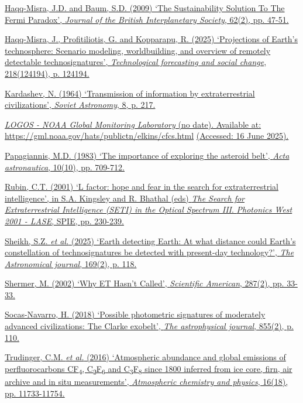 \href{http://paperpile.com/b/hQuIW4/lphP}{Haqq-Misra, J.D. and Baum, S.D. (2009) `The Sustainability Solution To The Fermi Paradox', \emph{Journal of the British Interplanetary Society}, 62(2), pp. 47-51.}

\href{http://paperpile.com/b/hQuIW4/AWHk}{Haqq-Misra, J., Profitiliotis, G. and Kopparapu, R. (2025) `Projections of Earth's technosphere: Scenario modeling, worldbuilding, and overview of remotely detectable technosignatures', \emph{Technological forecasting and social change}, 218(124194), p. 124194.}

\href{http://paperpile.com/b/hQuIW4/6tyN}{Kardashev, N. (1964) `Transmission of information by extraterrestrial civilizations', \emph{Soviet Astronomy}, 8, p. 217.}

\href{http://paperpile.com/b/hQuIW4/zmLw}{\emph{LOGOS - NOAA Global Monitoring Laboratory} (no date). Available at:} \url{https://gml.noaa.gov/hats/publictn/elkins/cfcs.html} \href{http://paperpile.com/b/hQuIW4/zmLw}{(Accessed: 16 June 2025).}

\href{http://paperpile.com/b/hQuIW4/Cy4U}{Papagiannis, M.D. (1983) `The importance of exploring the asteroid belt', \emph{Acta astronautica}, 10(10), pp. 709-712.}

\href{http://paperpile.com/b/hQuIW4/jkfy}{Rubin, C.T. (2001) `L factor: hope and fear in the search for extraterrestrial intelligence', in S.A. Kingsley and R. Bhathal (eds) \emph{The Search for Extraterrestrial Intelligence (SETI) in the Optical Spectrum III}. \emph{Photonics West 2001 - LASE}, SPIE, pp. 230-239.}

\href{http://paperpile.com/b/hQuIW4/rbOz}{Sheikh, S.Z. \emph{et al.} (2025) `Earth detecting Earth: At what distance could Earth's constellation of technosignatures be detected with present-day technology?', \emph{The Astronomical journal}, 169(2), p. 118.}

\href{http://paperpile.com/b/hQuIW4/pYHX}{Shermer, M. (2002) `Why ET Hasn't Called', \emph{Scientific American}, 287(2), pp. 33-33.}

\href{http://paperpile.com/b/hQuIW4/EjlN}{Socas-Navarro, H. (2018) `Possible photometric signatures of moderately advanced civilizations: The Clarke exobelt', \emph{The astrophysical journal}, 855(2), p. 110.}

\href{http://paperpile.com/b/hQuIW4/tKVa}{Trudinger, C.M. \emph{et al.} (2016) `Atmospheric abundance and global emissions of perfluorocarbons CF\textsubscript{4}, C\textsubscript{2}F\textsubscript{6} and C\textsubscript{3}F\textsubscript{8} since 1800 inferred from ice core, firn, air archive and in situ measurements', \emph{Atmospheric chemistry and physics}, 16(18), pp. 11733-11754.}

